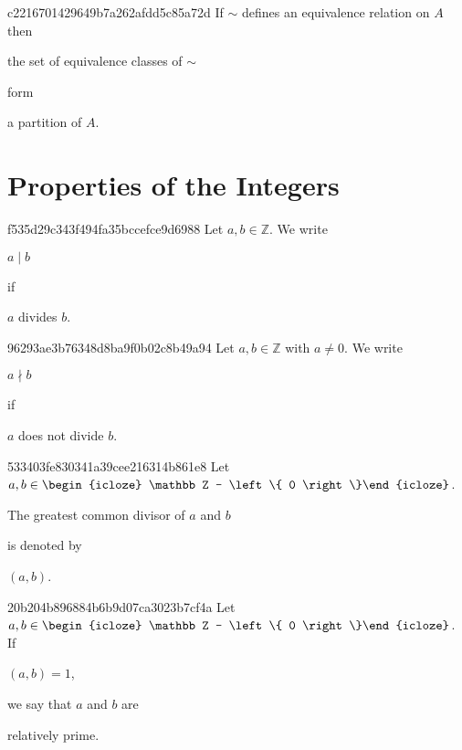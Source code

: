 \begin{note}{c2216701429649b7a262afdd5c85a72d}
    If \({ \sim }\) defines an equivalence relation on \({ A }\) then \begin{icloze}{2}the set of equivalence classes of \({ \sim }\)\end{icloze} form \begin{icloze}{1}a partition of \({ A }\).\end{icloze}
\end{note}

\section{Properties of the Integers}
\begin{note}{f535d29c343f494fa35bccefce9d6988}
    Let \({ a, b \in \mathbb Z }\).
    We write \begin{icloze}{2}\({ a \mid b }\)\end{icloze} if \begin{icloze}{1}\({ a }\) divides \({ b }\).\end{icloze}
\end{note}

\begin{note}{96293ae3b76348d8ba9f0b02c8b49a94}
    Let \({ a, b \in \mathbb Z }\) with \({ a \neq 0 }\).
    We write \begin{icloze}{2}\({ a \nmid b }\)\end{icloze} if \begin{icloze}{1}\({ a }\) does not divide \({ b }\).\end{icloze}
\end{note}

\begin{note}{533403fe830341a39cee216314b861e8}
    Let \({ a, b \in \begin{icloze}{3}\mathbb Z - \left\{ 0 \right\}\end{icloze} }\).
    \begin{icloze}{2}The greatest common divisor of \({ a }\) and \({ b }\)\end{icloze} is denoted by \begin{icloze}{1}\({ (a, b) }\).\end{icloze}
\end{note}

\begin{note}{20b204b896884b6b9d07ca3023b7cf4a}
    Let \({ a, b \in \begin{icloze}{3}\mathbb Z - \left\{ 0 \right\}\end{icloze} }\).
    If \begin{icloze}{2}\({ (a, b) = 1 }\),\end{icloze} we say that \({ a }\) and \({ b }\) are \begin{icloze}{1}relatively prime.\end{icloze}
\end{note}

